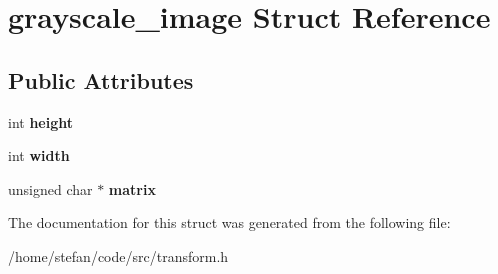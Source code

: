 \hypertarget{structgrayscale__image}{}\section{grayscale\+\_\+image Struct Reference}
\label{structgrayscale__image}
\subsection*{Public Attributes}
\begin{DoxyCompactItemize}
\item 
\mbox{\label{structgrayscale__image_a2993bc65aa6a7acd28e6f419baadfd67}} 
int {\bfseries height}
\item 
\mbox{\label{structgrayscale__image_aa3e10cbce907f52294577a410da7d7bf}} 
int {\bfseries width}
\item 
\mbox{\label{structgrayscale__image_aad0575c83e950ff107789aeb4e5a8548}} 
unsigned char $\ast$ {\bfseries matrix}
\end{DoxyCompactItemize}


The documentation for this struct was generated from the following file\+:\begin{DoxyCompactItemize}
\item 
/home/stefan/code/src/transform.\+h\end{DoxyCompactItemize}
